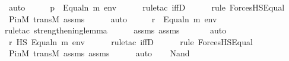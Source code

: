 \begin{isabellebody}
\ auto\isanewline
\ \ \isamarkupfalse%
\ \isamarkupfalse%
\ {\isachardoublequoteopen}p\ {\isasymtturnstile}\ {\isacharparenleft}{\kern0pt}Equal{\isacharparenleft}{\kern0pt}n{\isacharcomma}{\kern0pt}\ m{\isacharparenright}{\kern0pt}{\isacharparenright}{\kern0pt}\ env{\isachardoublequoteclose}\ \isanewline
\ \ \ \ \isamarkupfalse%
{\isacharparenleft}{\kern0pt}rule{\isacharunderscore}{\kern0pt}tac\ iffD{}{\isacharparenright}{\kern0pt}\isanewline
\ \ \ \ \ \isamarkupfalse%
{\isacharparenleft}{\kern0pt}rule\ ForcesHS{\isacharunderscore}{\kern0pt}Equal{\isacharparenright}{\kern0pt}\isanewline
\ \ \ \ \isamarkupfalse%
\ P{\isacharunderscore}{\kern0pt}in{\isacharunderscore}{\kern0pt}M\ transM\ assms\isanewline
\ \ \ \ \isamarkupfalse%
\ auto\isanewline
\ \ \isamarkupfalse%
\ \isamarkupfalse%
\ {\isachardoublequoteopen}r\ {\isasymtturnstile}\ {\isacharparenleft}{\kern0pt}Equal{\isacharparenleft}{\kern0pt}n{\isacharcomma}{\kern0pt}\ m{\isacharparenright}{\kern0pt}{\isacharparenright}{\kern0pt}\ env{\isachardoublequoteclose}\ \isanewline
\ \ \ \ \isamarkupfalse%
{\isacharparenleft}{\kern0pt}rule{\isacharunderscore}{\kern0pt}tac\ strengthening{\isacharunderscore}{\kern0pt}lemma{\isacharparenright}{\kern0pt}\isanewline
\ \ \ \ \isamarkupfalse%
\ assms\ assms{}\ \isanewline
\ \ \ \ \isamarkupfalse%
\ auto\isanewline
\ \ \isamarkupfalse%
\ \isamarkupfalse%
\ {\isachardoublequoteopen}r\ {\isasymtturnstile}HS\ {\isacharparenleft}{\kern0pt}Equal{\isacharparenleft}{\kern0pt}n{\isacharcomma}{\kern0pt}\ m{\isacharparenright}{\kern0pt}{\isacharparenright}{\kern0pt}\ env{\isachardoublequoteclose}\ \isanewline
\ \ \ \ \isamarkupfalse%
{\isacharparenleft}{\kern0pt}rule{\isacharunderscore}{\kern0pt}tac\ iffD{}{\isacharparenright}{\kern0pt}\isanewline
\ \ \ \ \ \isamarkupfalse%
{\isacharparenleft}{\kern0pt}rule\ ForcesHS{\isacharunderscore}{\kern0pt}Equal{\isacharparenright}{\kern0pt}\isanewline
\ \ \ \ \isamarkupfalse%
\ P{\isacharunderscore}{\kern0pt}in{\isacharunderscore}{\kern0pt}M\ transM\ assms\ assms{}\isanewline
\ \ \ \ \isamarkupfalse%
\ auto\isanewline
{}\isamarkupfalse%
\isanewline
\ \ \isamarkupfalse%
\ {\isacharparenleft}{\kern0pt}Nand\ {\isasymphi}\ {\isasympsi}{\isacharparenright}{\kern0pt}\isanewline

\end{isabellebody}
